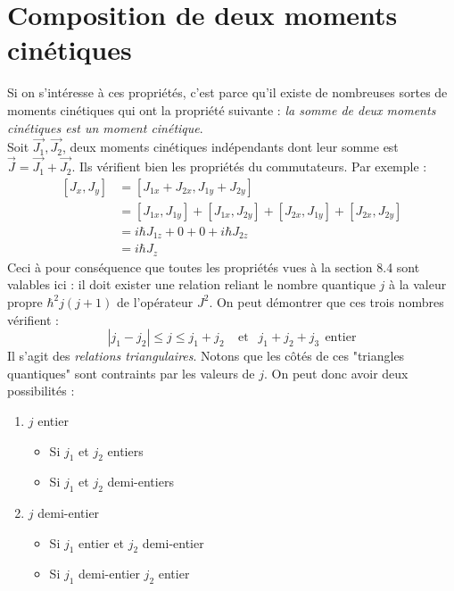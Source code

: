 \documentclass	[11pt, a4paper, openany]{book}
\begin{document}
	\section{Composition de deux moments cinétiques}
	Si on s'intéresse à ces propriétés, c'est parce qu'il existe de nombreuses sortes
	de moments cinétiques qui ont la propriété suivante : \textit{la somme de deux 
		moments cinétiques est un moment cinétique}.\\
	Soit $\vec{J_1},\vec{J_2}$, deux moments cinétiques indépendants dont leur 
	somme est $\vec{J} = \vec{J_1}+\vec{J_2}$. Ils vérifient bien les propriétés
	du commutateurs. Par exemple :
	\begin{equation}
		\begin{array}{ll}
			[J_x,J_y] & = [J_{1x}+J_{2x},J_{1y}+J_{2y}]                                                    \\
			          & = \left[J_{1x},J_{1y}\right]+\left[J_{1x},J_{2y}\right]+\left[J_{2x},J_{1y}\right] 
			+\left[J_{2x},J_{2y}\right]\\
			          & = i\hbar J_{1z } + 0 + 0 + i\hbar J_{2z}                                           \\
			          & = i\hbar J_{z}                                                                     
		\end{array}
	\end{equation}
	Ceci à pour conséquence que toutes les propriétés vues à la section 8.4 sont 
	valables ici : il doit exister une relation reliant le nombre quantique $j$ à
	la valeur propre $\hbar^2j(j+1)$ de l'opérateur $J^2$. On peut démontrer que 
	ces trois nombres vérifient :
	\begin{equation}
		|j_1-j_2| \leq j \leq j_1+j_2\ \ \ \ \ \text{et }\ \ j_1+j_2+j_3\ \ \text{entier}
	\end{equation}
	Il s'agit des \textit{relations triangulaires}. Notons que les côtés de ces 
	"triangles quantiques" sont contraints par les valeurs de $j$. On peut donc 
	avoir deux possibilités :
	\begin{enumerate}
		\item $j$ entier
		      \begin{itemize}
		      	\item Si $j_1$ et $j_2$ entiers
		      	\item Si $j_1$ et $j_2$ demi-entiers
		      \end{itemize}
		\item $j$ demi-entier
		      \begin{itemize}
		      	\item Si $j_1$ entier et $j_2$ demi-entier
		      	\item Si $j_1$ demi-entier $j_2$ entier
		      \end{itemize}
	\end{enumerate}
		
\end{document}
